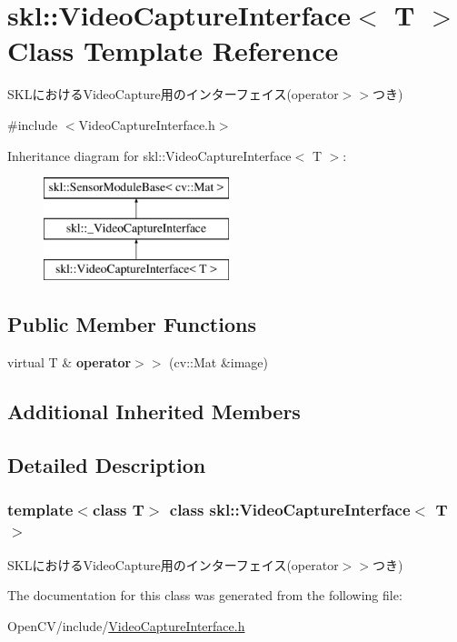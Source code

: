 \hypertarget{classskl_1_1_video_capture_interface}{}\section{skl\+:\+:Video\+Capture\+Interface$<$ T $>$ Class Template Reference}
\label{classskl_1_1_video_capture_interface}


S\+K\+Lにおける\+Video\+Capture用のインターフェイス(operator$>$$>$つき)  




{\ttfamily \#include $<$Video\+Capture\+Interface.\+h$>$}

Inheritance diagram for skl\+:\+:Video\+Capture\+Interface$<$ T $>$\+:\begin{figure}[H]
\begin{center}
\leavevmode
\includegraphics[height=3.000000cm]{classskl_1_1_video_capture_interface}
\end{center}
\end{figure}
\subsection*{Public Member Functions}
\begin{DoxyCompactItemize}
\item 
\hypertarget{classskl_1_1_video_capture_interface_ac4a2788a79f8a4a3382467e5fa67f128}{}\label{classskl_1_1_video_capture_interface_ac4a2788a79f8a4a3382467e5fa67f128} 
virtual T \& {\bfseries operator$>$$>$} (cv\+::\+Mat \&image)
\end{DoxyCompactItemize}
\subsection*{Additional Inherited Members}


\subsection{Detailed Description}
\subsubsection*{template$<$class T$>$\newline
class skl\+::\+Video\+Capture\+Interface$<$ T $>$}

S\+K\+Lにおける\+Video\+Capture用のインターフェイス(operator$>$$>$つき) 

The documentation for this class was generated from the following file\+:\begin{DoxyCompactItemize}
\item 
Open\+C\+V/include/\hyperlink{_video_capture_interface_8h}{Video\+Capture\+Interface.\+h}\end{DoxyCompactItemize}
